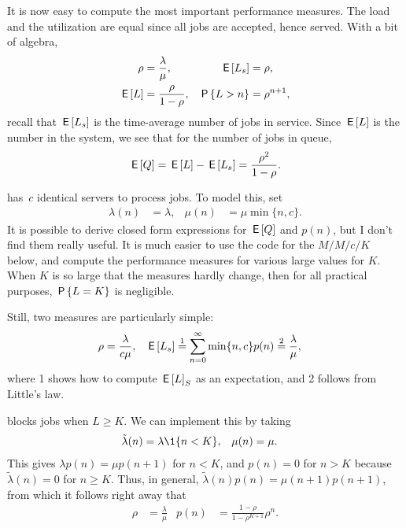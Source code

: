 \documentclass[stochastic-or.tex]{subfiles}
\begin{document}
It is now easy to compute the most important performance measures.
The load and the utilization are equal since all jobs are accepted, hence served.  With a bit of algebra,
\begin{align}\label{eq:el}
\rho &= \frac{\lambda}{\mu}, & \E{\Ls} &= \rho, \\
  \E \L &= \frac \rho{1-\rho}, & \P{\L> n} &= \rho^{n+1},
\end{align}
recall that $\E\Ls$ is the time-average number of jobs in service. Since $\E\L$ is the number in the system, we see that for the number of jobs in queue,
\begin{equation*}
\E \QQ = \E \L - \E{\Ls} = \frac{\rho^2}{1-\rho}.
\end{equation*}



 has~$c$ identical servers to process jobs.
To model this, set
\begin{align*}
\lambda(n) &= \lambda, & \mu(n) &= \mu \min\{n, c\}.
\end{align*}
It is possible to derive closed form expressions for $\E \QQ$ and $p(n)$, but I don't find them really useful.
It is much easier to use the code for the $M/M/c/K$ below, and compute the performance measures for various large values for $K$.
When $K$ is so large that the measures hardly change, then for all practical purposes, $\P{L=K}$ is negligible.

Still, two measures are particularly simple:
\begin{align*}
  \rho & = \frac{\lambda}{ c\mu}, & \E{\Ls} &\stackrel1= \sum_{n=0}^{\infty}\min\{n,c\} p(n) \stackrel2= \frac{\lambda}\mu,
\end{align*}
where 1 shows how to compute $\E L_{S}$ as an expectation, and 2 follows from Little's law.



 blocks jobs when $L\geq K$.
We can implement this by taking
\begin{align*}
\tilde \lambda(n) &= \lambda \1{n < K}, & \mu(n) &= \mu.
\end{align*}
This gives $\lambda p(n) = \mu p(n+1)$ for $n<K$, and $p(n) = 0$ for $n>K$ because $\tilde \lambda(n) = 0$ for $n\geq K$.
Thus, in general, $\tilde \lambda(n) p(n) = \mu(n+1)p(n+1)$, from which it follows right away that
 \begin{align*}
\rho &= \frac{\lambda}{\mu} & p(n) &= \frac{1-\rho}{1-\rho^{K+1}} \rho^n.
\end{align*}
\end{document}
